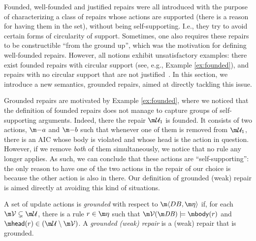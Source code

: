 Founded, well-founded and justified repairs were all introduced with the purpose of characterizing a class of repairs whose actions are supported (there is a reason for having them in the set), without being self-supporting. I.e., they try to avoid certain forms of circularity of support. 
Sometimes, one also requires these repairs to be constructible ``from the ground up'', which was the motivation for defining well-founded repairs.
However, all notions exhibit unsatisfactory examples: there exist founded repairs with circular support (see, e.g., Example \ref{ex:founded}), and repairs with no circular support that are not justified~\cite{tase/Cruz-FilipeGEN13}. %
In this section, we introduce a new semantics, grounded repairs, aimed at directly tackling this issue. 

Grounded repairs are motivated by Example \ref{ex:founded}, where we noticed that the definition of founded repairs does not manage to capture groups of self-supporting arguments. 
Indeed, there the repair $\UU_1$ is founded. It consists of two actions, $\remove a$ and $\remove b$ such that whenever one of them is removed from $\UU_1$, there is an AIC whose body is violated and whose head is the action in question. 
However, if we remove \emph{both} of them simultaneously, we notice that no rule any longer applies. As such, we can conclude that these actions are ``self-supporting'': the only reason to have one of the two actions in the repair of our choice is because the other action is also in there. 
Our definition of grounded (weak) repair is aimed directly at avoiding this kind of situations. 

\begin{definition}\label{def:grounded}
 A set of update actions \UU is \emph{grounded} with respect to $\fulldb$ if, for each $\VV \subsetneq  \UU$, there is a rule  $r\in \aics$ such that $\VV(\db)\models \body(r)$ and $\head(r)\in(\UU\setminus\VV)$. A \emph{grounded (weak) repair} is a (weak) repair that is grounded.
\end{definition}
  

